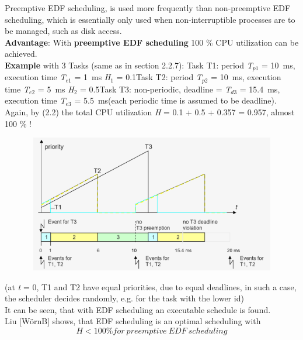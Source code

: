 Preemptive EDF scheduling, is used more frequently than non-preemptive EDF scheduling, which is essentially only used when non-interruptible processes are to be managed, such as disk access.\\

\textbf{Advantage}: With \textbf{preemptive EDF scheduling }100 \% CPU utilization can be achieved. \\

\textbf{Example} with 3 Tasks (same as in section 2.2.7): Task T1: period \textit{T}${}_{p1}$ = 10~ms, execution time \textit{T}${}_{e1}$ = 1~ms  \textit{H}${}_{1}$ = 0.1Task T2: period \textit{T}${}_{p2}$ = 10~ms, execution time\textit{ T}${}_{e2}$ = 5~ms  \textit{H}${}_{2}$ = 0.5Task T3: non-periodic, deadline = \textit{T}${}_{d3}$ = 15.4~ms, execution time\textit{ T}${}_{e3}$ = 5.5~ms(each periodic time is assumed to be deadline).\\

Again, by (2.2) the total CPU utilization \textit{H} = 0.1 + 0.5 + 0.357 = 0.957, almost 100 \% !\\

 	\begin{figure}[h]
    \centering
    \includegraphics[width=13cm, height=6cm]{Images/image101.png}
    \label{fig:Fig }
    \end{figure}
\newpage

(at \textit{t} = 0, T1 and T2 have equal priorities, due to equal deadlines, in such a case, the scheduler decides randomly, e.g. for the task with the lower id)\\

It can be seen, that with EDF scheduling an executable schedule is found. \\

Liu [W\"{o}rnB] shows, that EDF scheduling is an optimal scheduling with\\

\begin{equation}
	H \mathrm{<} 100 \% for\ preemptive\ EDF\ scheduling
\label{EQ }
\end{equation}

